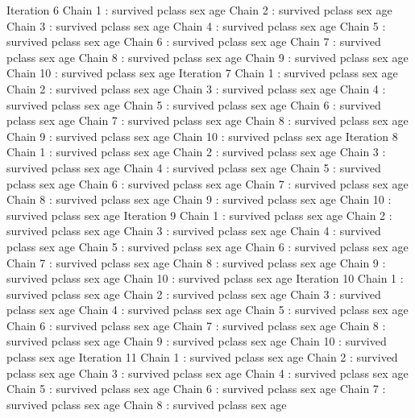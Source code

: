 \begin{Schunk}
\begin{Soutput}
Iteration 6 
 Chain 1 : survived   pclass   sex   age   
 Chain 2 : survived   pclass   sex   age   
 Chain 3 : survived   pclass   sex   age   
 Chain 4 : survived   pclass   sex   age   
 Chain 5 : survived   pclass   sex   age   
 Chain 6 : survived   pclass   sex   age   
 Chain 7 : survived   pclass   sex   age   
 Chain 8 : survived   pclass   sex   age   
 Chain 9 : survived   pclass   sex   age   
 Chain 10 : survived   pclass   sex   age   
Iteration 7 
 Chain 1 : survived   pclass   sex   age   
 Chain 2 : survived   pclass   sex   age   
 Chain 3 : survived   pclass   sex   age   
 Chain 4 : survived   pclass   sex   age   
 Chain 5 : survived   pclass   sex   age   
 Chain 6 : survived   pclass   sex   age   
 Chain 7 : survived   pclass   sex   age   
 Chain 8 : survived   pclass   sex   age   
 Chain 9 : survived   pclass   sex   age   
 Chain 10 : survived   pclass   sex   age   
Iteration 8 
 Chain 1 : survived   pclass   sex   age   
 Chain 2 : survived   pclass   sex   age   
 Chain 3 : survived   pclass   sex   age   
 Chain 4 : survived   pclass   sex   age   
 Chain 5 : survived   pclass   sex   age   
 Chain 6 : survived   pclass   sex   age   
 Chain 7 : survived   pclass   sex   age   
 Chain 8 : survived   pclass   sex   age   
 Chain 9 : survived   pclass   sex   age   
 Chain 10 : survived   pclass   sex   age   
Iteration 9 
 Chain 1 : survived   pclass   sex   age   
 Chain 2 : survived   pclass   sex   age   
 Chain 3 : survived   pclass   sex   age   
 Chain 4 : survived   pclass   sex   age   
 Chain 5 : survived   pclass   sex   age   
 Chain 6 : survived   pclass   sex   age   
 Chain 7 : survived   pclass   sex   age   
 Chain 8 : survived   pclass   sex   age   
 Chain 9 : survived   pclass   sex   age   
 Chain 10 : survived   pclass   sex   age   
Iteration 10 
 Chain 1 : survived   pclass   sex   age   
 Chain 2 : survived   pclass   sex   age   
 Chain 3 : survived   pclass   sex   age   
 Chain 4 : survived   pclass   sex   age   
 Chain 5 : survived   pclass   sex   age   
 Chain 6 : survived   pclass   sex   age   
 Chain 7 : survived   pclass   sex   age   
 Chain 8 : survived   pclass   sex   age   
 Chain 9 : survived   pclass   sex   age   
 Chain 10 : survived   pclass   sex   age   
Iteration 11 
 Chain 1 : survived   pclass   sex   age   
 Chain 2 : survived   pclass   sex   age   
 Chain 3 : survived   pclass   sex   age   
 Chain 4 : survived   pclass   sex   age   
 Chain 5 : survived   pclass   sex   age   
 Chain 6 : survived   pclass   sex   age   
 Chain 7 : survived   pclass   sex   age   
 Chain 8 : survived   pclass   sex   age   

\end{Soutput}
\end{Schunk}
